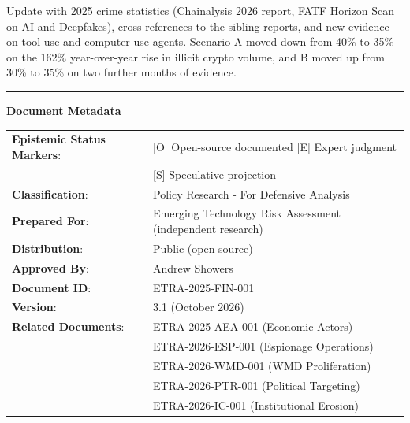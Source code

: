 \documentclass[11pt,letterpaper]{article}
\makeatletter
\newcommand{\etraneed}[1]{\par\if@nobreak\else\penalty\z@\ifdim\pagegoal<\maxdimen\ifdim\dimexpr\pagegoal-\pagetotal\relax<\dimexpr#1\relax\newpage\fi\fi\fi}
\makeatother
\begin{document}
\vspace{0.3cm}

\begin{infobox}
Update with 2025 crime statistics (Chainalysis 2026 report, FATF Horizon Scan on AI and Deepfakes), cross-references to the sibling reports, and new evidence on tool-use and computer-use agents. Scenario A moved down from 40\% to 35\% on the 162\% year-over-year rise in illicit crypto volume, and B moved up from 30\% to 35\% on two further months of evidence.
\end{infobox}


\etraneed{22\baselineskip}
\begin{center}
\rule{0.6\textwidth}{0.5pt}
\end{center}

\vspace{0.5cm}

\begin{center}
\small\textbf{Document Metadata}

\vspace{0.5em}

\begin{tabular}{ll}
\textbf{Epistemic Status Markers}: & [O] Open-source documented \textbar{} [E] Expert judgment \\
& [S] Speculative projection \\
\textbf{Classification}: & Policy Research - For Defensive Analysis \\
\textbf{Prepared For}: & Emerging Technology Risk Assessment (independent research) \\
\textbf{Distribution}: & Public (open-source) \\
\textbf{Approved By}: & Andrew Showers \\
\textbf{Document ID}: & ETRA-2025-FIN-001 \\
\textbf{Version}: & 3.1 (October 2026) \\
\textbf{Related Documents}: & ETRA-2025-AEA-001 (Economic Actors) \\
& ETRA-2026-ESP-001 (Espionage Operations) \\
& ETRA-2026-WMD-001 (WMD Proliferation) \\
& ETRA-2026-PTR-001 (Political Targeting) \\
& ETRA-2026-IC-001 (Institutional Erosion) \\
\end{tabular}
\end{center}
\end{document}
